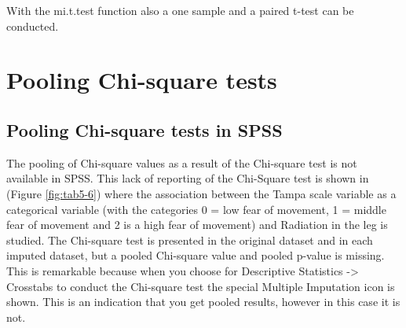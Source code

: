 \documentclass[]{book}
\theoremstyle{definition}
\theoremstyle{definition}
\theoremstyle{definition}
\theoremstyle{remark}
\begin{document}
With the mi.t.test function also a one sample and a paired t-test can be
conducted.

\section{Pooling Chi-square tests}\label{pooling-chi-square-tests}

\subsection{Pooling Chi-square tests in
SPSS}\label{pooling-chi-square-tests-in-spss}

The pooling of Chi-square values as a result of the Chi-square test is
not available in SPSS. This lack of reporting of the Chi-Square test is
shown in (Figure \ref{fig:tab5-6}) where the association between the
Tampa scale variable as a categorical variable (with the categories 0 =
low fear of movement, 1 = middle fear of movement and 2 is a high fear
of movement) and Radiation in the leg is studied. The Chi-square test is
presented in the original dataset and in each imputed dataset, but a
pooled Chi-square value and pooled p-value is missing. This is
remarkable because when you choose for Descriptive Statistics
-\textgreater{} Crosstabs to conduct the Chi-square test the special
Multiple Imputation icon is shown. This is an indication that you get
pooled results, however in this case it is not.
\end{document}
